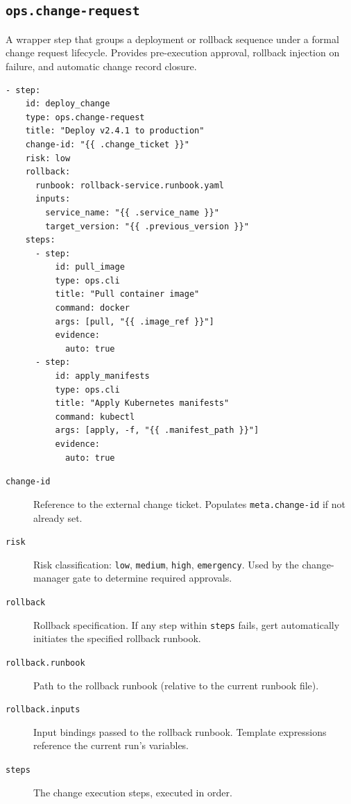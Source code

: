 \subsection{\texttt{ops.change-request}}

A wrapper step that groups a deployment or rollback sequence under a formal change request
lifecycle. Provides pre-execution approval, rollback injection on failure, and automatic
change record closure.

\begin{verbatim}
- step:
    id: deploy_change
    type: ops.change-request
    title: "Deploy v2.4.1 to production"
    change-id: "{{ .change_ticket }}"
    risk: low
    rollback:
      runbook: rollback-service.runbook.yaml
      inputs:
        service_name: "{{ .service_name }}"
        target_version: "{{ .previous_version }}"
    steps:
      - step:
          id: pull_image
          type: ops.cli
          title: "Pull container image"
          command: docker
          args: [pull, "{{ .image_ref }}"]
          evidence:
            auto: true
      - step:
          id: apply_manifests
          type: ops.cli
          title: "Apply Kubernetes manifests"
          command: kubectl
          args: [apply, -f, "{{ .manifest_path }}"]
          evidence:
            auto: true
\end{verbatim}

\begin{description}
  \item[\texttt{change-id}] Reference to the external change ticket. Populates
    \texttt{meta.change-id} if not already set.
  \item[\texttt{risk}] Risk classification: \texttt{low}, \texttt{medium}, \texttt{high},
    \texttt{emergency}. Used by the change-manager gate to determine required approvals.
  \item[\texttt{rollback}] Rollback specification. If any step within \texttt{steps} fails,
    gert automatically initiates the specified rollback runbook.
  \item[\texttt{rollback.runbook}] Path to the rollback runbook (relative to the current
    runbook file).
  \item[\texttt{rollback.inputs}] Input bindings passed to the rollback runbook. Template
    expressions reference the current run's variables.
  \item[\texttt{steps}] The change execution steps, executed in order.
\end{description}

